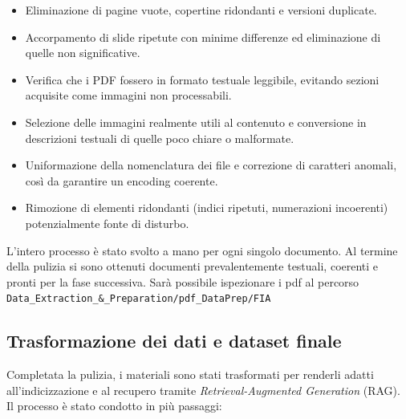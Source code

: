 \documentclass[a4paper,9pt]{article}
\begin{document}
\begin{itemize}
	\item Eliminazione di pagine vuote, copertine ridondanti e versioni duplicate.
	\item Accorpamento di slide ripetute con minime differenze ed eliminazione di quelle non significative.
	\item Verifica che i PDF fossero in formato testuale leggibile, evitando sezioni acquisite come immagini non processabili. 
	\item Selezione delle immagini realmente utili al contenuto e conversione in descrizioni testuali di quelle poco chiare o malformate.
	\item Uniformazione della nomenclatura dei file e correzione di caratteri anomali, così da garantire un encoding coerente.
	\item Rimozione di elementi ridondanti (indici ripetuti, numerazioni incoerenti) potenzialmente fonte di disturbo.
\end{itemize}
L'intero processo è stato svolto a mano per ogni singolo documento. Al termine della pulizia si sono ottenuti documenti prevalentemente testuali, coerenti e pronti per la fase successiva. Sarà possibile ispezionare i pdf al percorso \texttt{Data\_Extraction\_\&\_Preparation/pdf\_DataPrep/FIA} 

\subsection{Trasformazione dei dati e dataset finale}
Completata la pulizia, i materiali sono stati trasformati per renderli adatti all’indicizzazione e al recupero tramite \textit{Retrieval-Augmented Generation} (RAG).  
Il processo è stato condotto in più passaggi:
\end{document}
